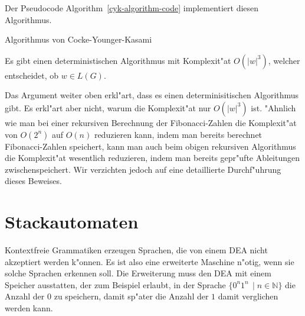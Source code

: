 Der Pseudocode Algorithm~\ref{cyk-algorithm-code} implementiert
diesen Algorithmus.
\begin{algorithm}
\caption{Algorithmus von Cocke-Younger-Kasami\label{cyk-algorithm-code}}
\end{algorithm}


\begin{satz}
\label{cyk-algorithm}
Es gibt einen deterministischen Algorithmus mit Komplexit"at
$O(|w|^3)$, welcher entscheidet, ob $w\in L(G)$.
\end{satz}

Das Argument weiter oben erkl"art, dass es einen determinisitischen
Algorithmus gibt. Es erkl"art aber nicht, warum die Komplexit"at
nur $O(|w|^3)$ ist. "Ahnlich wie man bei einer rekursiven Berechnung
der Fibonacci-Zahlen die Komplexit"at von $O(2^n)$ auf $O(n)$ reduzieren
kann, indem man bereits berechnet Fibonacci-Zahlen speichert, kann
man auch beim obigen rekursiven Algorithmus die Komplexit"at wesentlich
reduzieren, indem man bereits gepr"ufte Ableitungen zwischenspeichert.
Wir verzichten jedoch auf eine detaillierte Durchf"uhrung dieses
Beweises.

\section{Stackautomaten}
Kontextfreie Grammatiken erzeugen Sprachen, die von einem DEA nicht
akzeptiert werden k"onnen. Es ist also eine erweiterte Maschine
n"otig, wenn sie solche Sprachen erkennen soll. Die Erweiterung muss
den DEA mit einem Speicher ausstatten, der zum Beispiel erlaubt, 
in der Sprache $\{0^n1^n\,\;|\; n\in\mathbb N\}$ die Anzahl der
$0$ zu speichern, damit sp"ater die Anzahl der $1$
damit verglichen werden kann.

